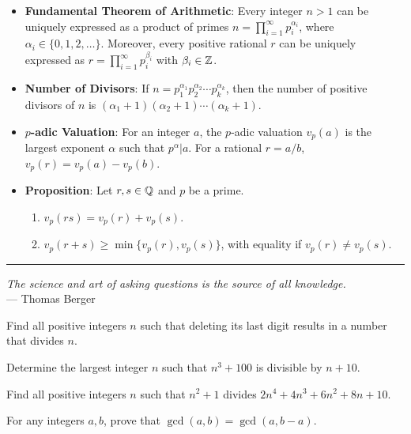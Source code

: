 \documentclass[12pt]{memoir}
\begin{document}
\begin{itemize}
    \item \textbf{Fundamental Theorem of Arithmetic}: Every integer \(n > 1\) can be uniquely expressed as a product of primes \(n = \prod_{i=1}^{\infty} p_i^{\alpha_i}\), where \(\alpha_i \in \{0, 1, 2, \dots \}\). Moreover, every positive rational \(r\) can be uniquely expressed as \(r = \prod_{i=1}^{\infty} p_i^{\beta_i}\) with \(\beta_i \in \mathbb{Z}\).
    \item \textbf{Number of Divisors}: If \(n = p_1^{\alpha_1} p_2^{\alpha_2} \cdots p_k^{\alpha_k}\), then the number of positive divisors of \(n\) is \((\alpha_1 + 1)(\alpha_2 + 1) \cdots (\alpha_k + 1)\).
    \item \textbf{\(p\)-adic Valuation}: For an integer \(a\), the \(p\)-adic valuation \(v_p(a)\) is the largest exponent \(\alpha\) such that \(p^{\alpha} | a\). For a rational \(r = a/b\), \(v_p(r) = v_p(a) - v_p(b)\).
    \item \textbf{Proposition}: Let \(r, s \in \mathbb{Q}\) and \(p\) be a prime.
    \begin{enumerate}
        \item \(v_p(rs) = v_p(r) + v_p(s)\).
        \item \(v_p(r + s) \geq \min\{v_p(r), v_p(s)\}\), with equality if \(v_p(r) \neq v_p(s)\).
    \end{enumerate}
\end{itemize}
\hrule
\begin{center}
    \textit{The science and art of asking questions is the source of all knowledge.} \\
    --- Thomas Berger
\end{center}

\begin{Ej}
Find all positive integers \(n\) such that deleting its last digit results in a number that divides \(n\).
\end{Ej}

\begin{Ej}
Determine the largest integer \(n\) such that \(n^3 + 100\) is divisible by \(n + 10\).
\end{Ej}

\begin{Ej}
Find all positive integers \(n\) such that \(n^2 + 1\) divides \(2n^4 + 4n^3 + 6n^2 + 8n + 10\).
\end{Ej}

\begin{Ej}
For any integers \(a, b\), prove that \(\gcd(a, b) = \gcd(a, b - a)\).
\end{Ej}
\end{document}
